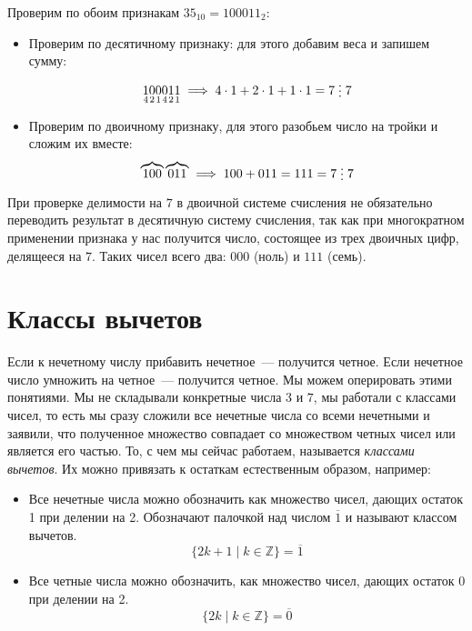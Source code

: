 \documentclass[russian]{lecture-notes}
\newcommand{\divs}{\mathrel{\raisebox{-2pt}{\vdots}}}
\newcommand{\klas}[1]{\overline{#1}}
\begin{document}
\begin{problem}
	\begin{example}
		Проверим по обоим признакам $35_{10}=100011_2$:
		\begin{itemize}
			\item Проверим по десятичному признаку: для этого добавим веса и запишем сумму:
			\[\underset{4}{1}\underset{2}{0}\underset{1}{0}\underset{4}{0}\underset{2}{1}\underset{1}{1} \implies 4\cdot1+2\cdot1+1\cdot1=7 \divs 7\]
			\item Проверим по двоичному признаку, для этого разобьем число на тройки и сложим их вместе:
			\[\overbrace{100}\overbrace{011} \implies 100+011=111=7 \divs 7\]
		\end{itemize}
	\end{example}
\end{problem}

\begin{note}
	При проверке делимости на $7$ в двоичной системе счисления не обязательно переводить результат в десятичную систему счисления, так как при многократном применении признака у нас получится число, состоящее из трех двоичных цифр, делящееся на $7$. Таких чисел всего два: $000$ (ноль) и $111$ (семь).
\end{note}

\section{Классы вычетов}

\begin{example}
	Если к нечетному числу прибавить нечетное~--- получится четное. Если нечетное число умножить на четное~--- получится четное. Мы можем оперировать этими понятиями. Мы не складывали конкретные числа $3$ и $7$, мы работали с  классами чисел, то есть мы сразу сложили все нечетные числа со всеми нечетными и заявили, что  полученное множество совпадает со множеством четных чисел или является его частью. То, с чем мы сейчас работаем, называется \emph{классами вычетов}. Их можно привязать к остаткам естественным образом, например:
	\begin{itemize}
		\item\label{exp:chet}Все нечетные числа можно обозначить как множество чисел, дающих остаток 1 при делении на 2. Обозначают палочкой над числом $\klas{1}$ и называют классом вычетов.
		\[ \{ 2k+1 \mid k \in \mathbb{Z}\} = \klas{1} \]
		\item\label{exp:nechet}Все четные числа можно обозначить, как множество чисел, дающих остаток 0 при делении на 2.
		\[ \{ 2k \mid k \in \mathbb{Z}\} = \klas{0}\]
	\end{itemize}
\end{example}
\end{document}
